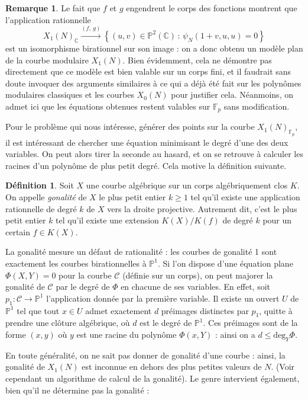\documentclass[11pt,a4paper]{article}
\newcommand{\C}{\mathbb{C}}
\newcommand{\F}{\mathbb{F}}
\renewcommand{\P}{\mathbb{P}}
\newcommand{\Cl}{\mathcal{C}}
\newcommand{\vers}{\longrightarrow}
\newcommand{\de}{\,:\,}
\theoremstyle{definition}
\newtheorem*{rem}{Remarque}
\newtheorem*{defi}{Définition}
\begin{document}
\begin{rem}
Le fait que $f$ et $g$ engendrent le corps des fonctions montrent que l'application rationnelle
$$X_1(N)_\C \overset{(f,\ g)}{\vers} \left\{(u, v)\in \P^2(\C) \de \psi_N(1+v, u, u) = 0\right\}$$
est un isomorphisme birationnel sur son image : on a donc obtenu un modèle plan de la courbe modulaire $X_1(N)$. Bien évidemment, cela ne démontre pas directement que ce modèle est bien valable sur un corps fini, et il faudrait sans doute invoquer des arguments similaires à ce qui a déjà été fait sur les polynômes modulaires classiques et les courbes $X_0(N)$ pour justifier cela. Néanmoins, on admet ici que les équations obtenues restent valables sur $\F_p$ sans modification.
\end{rem}

Pour le problème qui nous intéresse, générer des points sur la courbe $X_1(N)_{\F_p}$, il est intéressant de chercher une équation minimisant le degré d'une des deux variables. On peut alors tirer la seconde au hasard, et on se retrouve à calculer les racines d'un polynôme de plus petit degré. Cela motive la définition suivante.

\begin{defi}
Soit $X$ une courbe algébrique sur un corps algébriquement clos $K$. On appelle \emph{gonalité} de $X$ le plus petit entier $k\geq 1$ tel qu'il existe une application rationnelle de degré $k$ de $X$ vers la droite projective. Autrement dit, c'est le plus petit entier $k$ tel qu'il existe une extension $K(X)/K(f)$ de degré $k$ pour un certain $f\in K(X)$.
\end{defi}

La gonalité mesure un défaut de rationalité : les courbes de gonalité 1 sont exactement les courbes birationnelles à $\P^1$.
Si l'on dispose d'une équation plane $\Phi(X, Y) = 0$ pour la courbe $\Cl$ (définie sur un corps), on peut majorer la gonalité de $\Cl$ par le degré de $\Phi$ en chacune de ses variables. En effet, soit $p_1 : \Cl\vers \P^1$ l'application donnée par la première variable. Il existe un ouvert $U$ de $\P^1$ tel que tout $x\in U$ admet exactement $d$ préimages distinctes par $p_1$, quitte à prendre une clôture algébrique, où $d$ est le degré de $\P^1$. Ces préimages sont de la forme $(x, y)$ où $y$ est une racine du polynôme $\Phi(x, Y)$ : ainsi on a $d \leq \mathrm{deg}_Y \Phi$.

En toute généralité, on ne sait pas donner de gonalité d'une courbe : ainsi, la gonalité de $X_1(N)$ est inconnue en dehors des plus petites valeurs de $N$. (Voir cependant un algorithme de calcul de la gonalité). Le genre intervient également, bien qu'il ne détermine pas la gonalité :
\end{document}
